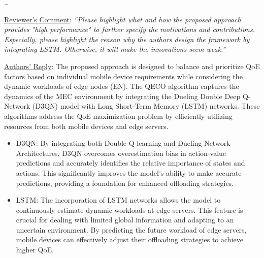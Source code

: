 \documentclass[12pt,draftclsnofoot,onecolumn]{IEEEtran}
\newenvironment{my}[2]%
{\begin{list}{}%
{\setlength{\rightmargin}{#1}\setlength{\leftmargin}{#2}}%


 \item[]{}

} {\end{list}}
\begin{document}
\begin{enumerate}
\begin{my}{1cm}{1cm}
{\dots

 }
\end{my}



\vspace{6mm}

\item \underline{Reviewer's Comment}: 
\textit{``Please highlight what and how the proposed approach provides "high performance" to further specify the motivations and contributions. Especially, please highlight the reason why the authors design the framework by integrating LSTM. Otherwise, it will make the innovations seem weak.''} \newline

\underline{Authors' Reply}: The proposed approach is designed to balance and prioritize QoE factors based on individual mobile device requirements while considering the dynamic workloads of edge nodes (EN). The QECO algorithm captures the dynamics of the MEC environment by integrating the Dueling Double Deep Q-Network (D3QN) model with Long Short-Term Memory (LSTM) networks. These algorithms address the QoE maximization problem by efficiently utilizing resources from both mobile devices and edge servers.

\begin{itemize}
	
	\item D3QN: By integrating both Double Q-learning and Dueling Network Architectures, D3QN overcomes overestimation bias in action-value predictions and accurately identifies the relative importance of states and actions. This significantly improves the model's ability to make accurate predictions, providing a foundation for enhanced offloading strategies.\vspace{2mm}
	
	\item LSTM: The incorporation of LSTM networks allows the model to continuously estimate dynamic workloads at edge servers. This feature is crucial for dealing with limited global information and adapting to an uncertain environment. By predicting the future workload of edge servers, mobile devices can effectively adjust their offloading strategies to achieve higher QoE.\vspace{2mm}
	
\end{itemize}





\end{enumerate}
\end{document}
